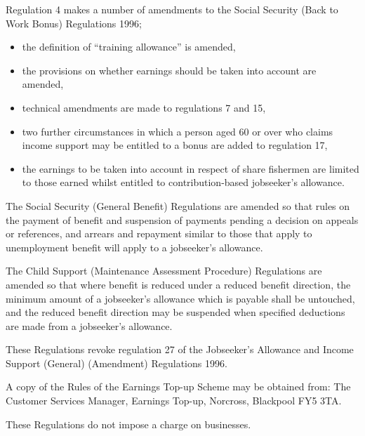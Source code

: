 \documentclass[12pt,a4paper]{article}
\begin{document}
  Regulation 4 makes a number of amendments to the Social Security (Back to Work Bonus) Regulations 1996;
\begin{itemize}
\item the definition of “training allowance” is amended,
\item the provisions on whether earnings should be taken into account are amended,
\item technical amendments are made to regulations 7 and 15,
\item two further circumstances in which a person aged 60 or over who claims income support may be entitled to a bonus are added to regulation 17,
\item the earnings to be taken into account in respect of share fishermen are limited to those earned whilst entitled to contribution-based jobseeker’s allowance.
\end{itemize}

  The Social Security (General Benefit) Regulations are amended so that rules on the payment of benefit and suspension of payments pending a decision on appeals or references, and arrears and repayment similar to those that apply to unemployment benefit will apply to a jobseeker’s allowance.

  The Child Support (Maintenance Assessment Procedure) Regulations are amended so that where benefit is reduced under a reduced benefit direction, the minimum amount of a jobseeker’s allowance which is payable shall be untouched, and the reduced benefit direction may be suspended when specified deductions are made from a jobseeker’s allowance.

  These Regulations revoke regulation 27 of the Jobseeker’s Allowance and Income Support (General) (Amendment) Regulations 1996.

  A copy of the Rules of the Earnings Top-up Scheme may be obtained from:
 The Customer Services Manager,
Earnings Top-up,
Norcross,
Blackpool {\scshape FY}5 3TA.

  These Regulations do not impose a charge on businesses.
\end{document}
